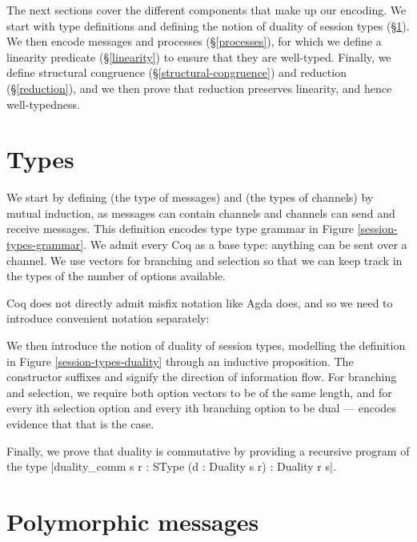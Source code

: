 \documentclass{mproj}
\begin{document}
The next sections cover the different components that make up our encoding. We start with type definitions and defining the notion of duality of session types (\S \ref{types}). We then encode messages and processes (\S \ref{processes}), for which we define a linearity predicate (\S \ref{linearity}) to ensure that they are well-typed. Finally, we define structural congruence (\S \ref{structural-congruence}) and reduction (\S \ref{reduction}), and we then prove that reduction preserves linearity, and hence well-typedness.

\section{Types}\label{types}

We start by defining  (the type of messages) and  (the types of channels) by mutual induction, as messages can contain channels and channels can send and receive messages. This definition encodes type type grammar in Figure \ref{session-types-grammar}. We admit every Coq  as a base type: anything can be sent over a channel. We use vectors for branching and selection so that we can keep track in the types of the number of options available.


Coq does not directly admit misfix notation like Agda does, and so we need to introduce convenient notation separately:


We then introduce the notion of duality of session types, modelling the definition in Figure \ref{session-types-duality} through an inductive proposition. The constructor suffixes  and  signify the direction of information flow. For branching and selection, we require both option vectors to be of the same length, and for every ith selection option and every ith branching option to be dual ---  encodes evidence that that is the case. 


Finally, we prove that duality is commutative by providing a recursive program of the type \coqe|duality_comm {s r : SType} (d : Duality s r) : Duality r s|.

\section{Polymorphic messages}\label{polymorphism}
\end{document}
